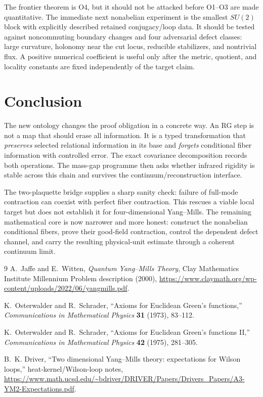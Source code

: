 \documentclass[11pt]{article}
\theoremstyle{remark}
\begin{document}
The frontier theorem is O4, but it should not be attacked before O1--O3 are
made quantitative.  The immediate next nonabelian experiment is the smallest
$SU(2)$ block with explicitly described retained conjugacy/loop data.  It should
be tested against noncommuting boundary changes and four adversarial defect
classes: large curvature, holonomy near the cut locus, reducible stabilizers,
and nontrivial flux.  A positive numerical coefficient is useful only after the
metric, quotient, and locality constants are fixed independently of the target
claim.

\section{Conclusion}

The new ontology changes the proof obligation in a concrete way.  An RG step is
not a map that should erase all information.  It is a typed transformation that
\emph{preserves} selected relational information in its base and
\emph{forgets} conditional fiber information with controlled error.  The exact
covariance decomposition records both operations.  The mass-gap programme then
asks whether infrared rigidity is stable across this chain and survives the
continuum/reconstruction interface.

The two-plaquette bridge supplies a sharp sanity check: failure of full-mode
contraction can coexist with perfect fiber contraction.  This rescues a viable
local target but does not establish it for four-dimensional Yang--Mills.  The
remaining mathematical core is now narrower and more honest: construct the
nonabelian conditional fibers, prove their good-field contraction, control the
dependent defect channel, and carry the resulting physical-unit estimate
through a coherent continuum limit.

\begin{thebibliography}{9}
A.~Jaffe and E.~Witten,
\emph{Quantum Yang--Mills Theory}, Clay Mathematics Institute Millennium
Problem description (2000),
\url{https://www.claymath.org/wp-content/uploads/2022/06/yangmills.pdf}.

K.~Osterwalder and R.~Schrader,
``Axioms for Euclidean Green's functions,''
\emph{Communications in Mathematical Physics} \textbf{31} (1973), 83--112.

K.~Osterwalder and R.~Schrader,
``Axioms for Euclidean Green's functions II,''
\emph{Communications in Mathematical Physics} \textbf{42} (1975), 281--305.

B.~K. Driver,
``Two dimensional Yang--Mills theory: expectations for Wilson loops,''
heat-kernel/Wilson-loop notes,
\url{https://www.math.ucsd.edu/~bdriver/DRIVER/Papers/Drivers_Papers/A3-YM2-Expectations.pdf}.
\end{thebibliography}
\end{document}
